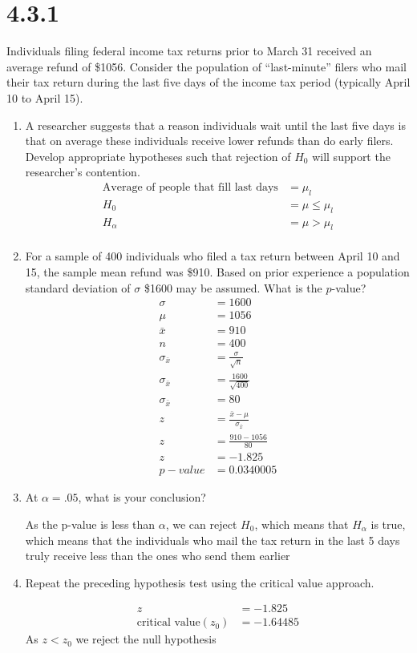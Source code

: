 \documentclass{article}
\begin{document}
\section*{4.3.1}
Individuals filing federal income tax returns prior to March 31 received an average refund of \$1056. Consider the population of “last-minute” filers who mail their tax return during the last five days of the income tax period (typically April 10 to April 15).
\begin{enumerate}
  \item A researcher suggests that a reason individuals wait until the last five days is that on average these individuals receive lower refunds than do early filers. Develop appropriate hypotheses such that rejection of $H_{0}$ will support the researcher’s contention.
  \begin{align*}
    \text{Average of people that fill last days} &= \mu_{l}\\
    H_{0} &= \mu \leq \mu_{l}\\
    H_{\alpha} &= \mu > \mu_{l}\\
  \end{align*}

  \item For a sample of 400 individuals who filed a tax return between April 10 and 15, the sample mean refund was \$910. Based on prior experience a population standard deviation of $\sigma$ \$1600 may be assumed. What is the $p$-value?
  \begin{align*}
    \sigma &= 1600\\
    \mu &= 1056\\
    \bar{x} &= 910\\
    n &= 400\\
    \sigma_{\bar{x}} &= \frac{\sigma}{\sqrt{n}}\\
    \sigma_{\bar{x}} &= \frac{1600}{\sqrt{400}}\\
    \sigma_{\bar{x}} &= 80\\
    z &= \frac{\bar{x} - \mu}{\sigma_{\bar{x}}}\\
    z &= \frac{910 - 1056}{80}\\
    z &= -1.825\\
    p-value &= 0.0340005
  \end{align*}

  \item At $\alpha =.05$, what is your conclusion?

  As the p-value is less than $\alpha$, we can reject $H_{0}$, which means that $H_{\alpha}$ is true, which means that the individuals who mail the tax return in the last 5 days truly receive less than the ones who send them earlier

  \item Repeat the preceding hypothesis test using the critical value approach.

  \begin{align*}
    z &= -1.825\\
    \text{critical value} (z_{0}) &= -1.64485
  \end{align*}
  As $z < z_{0}$ we reject the null hypothesis

\end{enumerate}
\pagebreak
\end{document}
